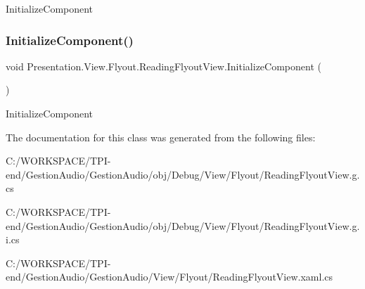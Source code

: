 Initialize\+Component 

\mbox{\label{class_presentation_1_1_view_1_1_flyout_1_1_reading_flyout_view_a56201647e9af359ad367496f91779872}} 
\subsubsection{\texorpdfstring{Initialize\+Component()}{InitializeComponent()}\hspace{0.1cm}{\footnotesize\ttfamily [4/4]}}
{\footnotesize\ttfamily void Presentation.\+View.\+Flyout.\+Reading\+Flyout\+View.\+Initialize\+Component (\begin{DoxyParamCaption}{ }\end{DoxyParamCaption})}



Initialize\+Component 



The documentation for this class was generated from the following files\+:\begin{DoxyCompactItemize}
\item 
C\+:/\+W\+O\+R\+K\+S\+P\+A\+C\+E/\+T\+P\+I-\/end/\+Gestion\+Audio/\+Gestion\+Audio/obj/\+Debug/\+View/\+Flyout/Reading\+Flyout\+View.\+g.\+cs\item 
C\+:/\+W\+O\+R\+K\+S\+P\+A\+C\+E/\+T\+P\+I-\/end/\+Gestion\+Audio/\+Gestion\+Audio/obj/\+Debug/\+View/\+Flyout/Reading\+Flyout\+View.\+g.\+i.\+cs\item 
C\+:/\+W\+O\+R\+K\+S\+P\+A\+C\+E/\+T\+P\+I-\/end/\+Gestion\+Audio/\+Gestion\+Audio/\+View/\+Flyout/Reading\+Flyout\+View.\+xaml.\+cs\end{DoxyCompactItemize}
